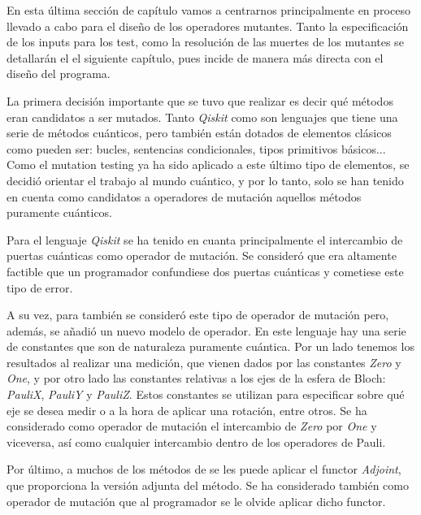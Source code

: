 En esta última sección de capítulo vamos a centrarnos principalmente en proceso llevado a cabo para el diseño de los operadores mutantes. Tanto la especificación de los inputs para los test, como la resolución de las muertes de los mutantes se detallarán el el siguiente capítulo, pues incide de manera más directa con el diseño del programa.

La primera decisión importante que se tuvo que realizar es decir qué métodos eran candidatos a ser mutados. Tanto \textit{Qiskit} como \qsh son lenguajes que tiene una serie de métodos cuánticos, pero también están dotados de elementos clásicos como pueden ser: bucles, sentencias condicionales, tipos primitivos básicos... Como el mutation testing ya ha sido aplicado a este último tipo de elementos, se decidió orientar el trabajo al mundo cuántico, y por lo tanto, solo se han tenido en cuenta como candidatos a operadores de mutación aquellos métodos puramente cuánticos.

Para el lenguaje \textit{Qiskit} se ha tenido en cuanta principalmente el intercambio de puertas cuánticas como operador de mutación. Se consideró que era altamente factible que un programador confundiese dos puertas cuánticas y cometiese este tipo de error.

A su vez, para \qsh también se consideró este tipo de operador de mutación pero, además, se añadió un nuevo modelo de operador. En este lenguaje hay una serie de constantes que son de naturaleza puramente cuántica. Por un lado tenemos los resultados al realizar una medición, que vienen dados por las constantes \textit{Zero} y \textit{One}, y por otro lado las constantes relativas a los ejes de la esfera de Bloch: \textit{PauliX}, \textit{PauliY} y \textit{PauliZ}. Estos constantes se utilizan para especificar sobre qué eje se desea medir o a la hora de aplicar una rotación, entre otros. Se ha considerado como operador de mutación el intercambio de \textit{Zero} por \textit{One} y viceversa, así como cualquier intercambio dentro de los operadores de Pauli.

Por último, a muchos de los métodos de \qsh se les puede aplicar el functor \textit{Adjoint}, que proporciona la versión adjunta del método. Se ha considerado también como operador de mutación que al programador se le olvide aplicar dicho functor.